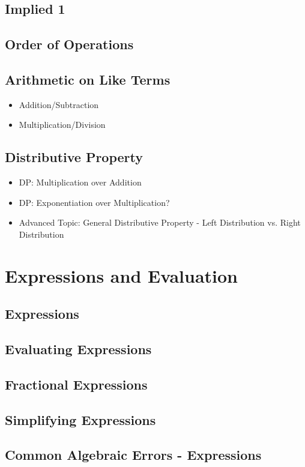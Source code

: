 \documentclass[11pt]{article}
\begin{document}
\subsection{Implied 1}
\subsection{Order of Operations}
\subsection{Arithmetic on Like Terms}
\begin{itemize}
    \item Addition/Subtraction
    \item Multiplication/Division
\end{itemize}
\subsection{Distributive Property}
\begin{itemize}
    \item DP: Multiplication over Addition
    \item DP: Exponentiation over Multiplication?
    \item Advanced Topic: General Distributive Property - Left Distribution vs. Right Distribution
\end{itemize}

\setcounter{section}{2}
\section{Expressions and Evaluation}
\subsection{Expressions}
\subsection{Evaluating Expressions}
\subsection{Fractional Expressions}
\subsection{Simplifying Expressions}
\subsection{Common Algebraic Errors - Expressions}
\end{document}
